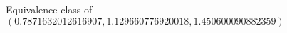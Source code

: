 \documentclass[preview]{standalone}
\begin{document}
\begin{center}
Equivalence class of $(0.7871632012616907, 1.129660776920018, 1.450600090882359)$
\end{center}
\end{document}
